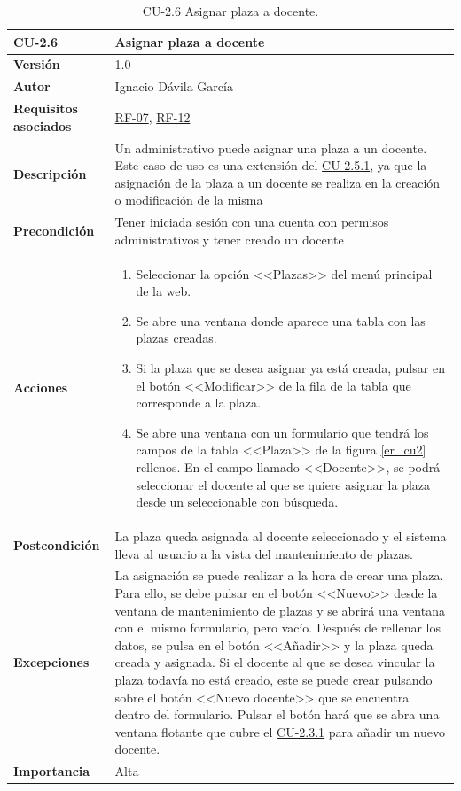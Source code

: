 \begin{table}[p]
\label{table:CU-2.6}
	\centering
	\begin{tabularx}{\linewidth}{ p{} p{} }
		\toprule
		\textbf{CU-2.6}    & \textbf{Asignar plaza a docente}\\
		\toprule
		\textbf{Versión}              & 1.0    \\
		\textbf{Autor}                & Ignacio Dávila García \\
		\textbf{Requisitos asociados} & \hyperref[itm:RF7]{RF-07}, \hyperref[itm:RF12]{RF-12} \\
		\textbf{Descripción}          & Un administrativo puede asignar una plaza a un docente. Este caso de uso es una extensión del \hyperref[table:CU-2.5.1]{CU-2.5.1}, ya que la asignación de la plaza a un docente se realiza en la creación o modificación de la misma \\
		\textbf{Precondición}         & Tener iniciada sesión con una cuenta con permisos administrativos y tener creado un docente \\
		\textbf{Acciones}             &
		\begin{enumerate}
			\def\labelenumi{\arabic{enumi}.}
			\tightlist
			\item Seleccionar la opción <<Plazas>> del menú principal de la web.
			\item Se abre una ventana donde aparece una tabla con las plazas creadas.
			\item Si la plaza que se desea asignar ya está creada, pulsar en el botón <<Modificar>> de la fila de la tabla que corresponde a la plaza.
			\item Se abre una ventana con un formulario que tendrá los campos de la tabla <<Plaza>> de la figura \ref{er_cu2} rellenos. En el campo llamado <<Docente>>, se podrá seleccionar el docente al que se quiere asignar la plaza desde un seleccionable con búsqueda.
		\end{enumerate}\\
		\textbf{Postcondición}        & La plaza queda asignada al docente seleccionado y el sistema lleva al usuario a la vista del mantenimiento de plazas. \\
		\textbf{Excepciones}          & La asignación se puede realizar a la hora de crear una plaza. Para ello, se debe pulsar en el botón <<Nuevo>> desde la ventana de mantenimiento de plazas y se abrirá una ventana con el mismo formulario, pero vacío. Después de rellenar los datos, se pulsa en el botón <<Añadir>> y la plaza queda creada y asignada.
		Si el docente al que se desea vincular la plaza todavía no está creado, este se puede crear pulsando sobre el botón <<Nuevo docente>> que se encuentra dentro del formulario. Pulsar el botón hará que se abra una ventana flotante que cubre el \hyperref[table:CU-2.3.1]{CU-2.3.1} para añadir un nuevo docente.\\
		\textbf{Importancia}          & Alta \\
		\bottomrule
	\end{tabularx}
	\caption{CU-2.6 Asignar plaza a docente.}
\end{table}
\FloatBarrier

